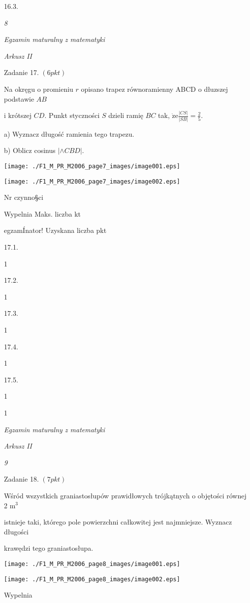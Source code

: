 \documentclass[a4paper,12pt]{article}
\begin{document}
16.3.





{\it 8}

{\it Egzamin maturalny z matematyki}

{\it Arkusz II}

Zadanie 17. $(6pkt)$

Na okręgu o promieniu $r$ opisano trapez równoramienny ABCD o dłuzszej podstawie $AB$

i krótszej $CD$. Punkt styczności $S$ dzieli ramię $BC$ tak, $\displaystyle \dot{\mathrm{z}}\mathrm{e}\frac{|CS|}{|SB|}=\frac{2}{5}.$

a) Wyznacz długość ramienia tego trapezu.

b) Oblicz cosinus $|\wedge CBD|.$
\begin{center}
\texttt{[image: ./F1\_M\_PR\_M2006\_page7\_images/image001.eps]}

\texttt{[image: ./F1\_M\_PR\_M2006\_page7\_images/image002.eps]}
\end{center}
Nr czynno\S ci

Wypelnia Maks. liczba kt

egzamÍnator! Uzyskana liczba pkt

17.1.

1

17.2.

1

17.3.

1

17.4.

1

17.5.

1

1





{\it Egzamin maturalny z matematyki}

{\it Arkusz II}

{\it 9}

Zadanie 18. $(7pkt)$

Wśród wszystkich graniastosłupów prawidłowych trójkątnych o objętości równej 2 $\mathrm{m}^{3}$

istnieje taki, którego pole powierzchni całkowitej jest najmniejsze. Wyznacz długości

krawędzi tego graniastosłupa.
\begin{center}
\texttt{[image: ./F1\_M\_PR\_M2006\_page8\_images/image001.eps]}

\texttt{[image: ./F1\_M\_PR\_M2006\_page8\_images/image002.eps]}
\end{center}
Wypelnia
\end{document}
